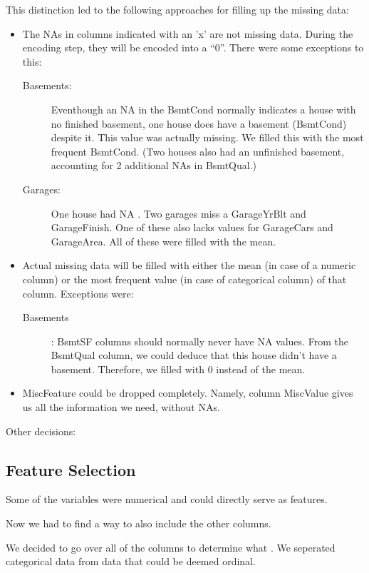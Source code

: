 \documentclass[a4paper, 12pt, twoside]{report}
\begin{document}
This distinction led to the following approaches for filling up the missing data:

\begin{itemize}
	\item The NAs in columns indicated with an 'x' are not missing data. During the encoding step, they will be encoded into a ``0''. There were some exceptions to this:
	\begin{description}
		\item[Basements:] Eventhough an NA in the BsmtCond normally indicates a house with no finished basement, one house does have a basement (BsmtCond) despite it. This value was actually missing.  We filled this with the most frequent BsmtCond. (Two houses also had an unfinished basement, accounting for 2 additional NAs in BsmtQual.)
		\item[Garages:] One house had NA . Two garages miss a GarageYrBlt and GarageFinish.  One of these also lacks values for GarageCars and GarageArea. All of these were filled with the mean.
\end{description}	
	
	\item Actual missing data will be filled with either the mean (in case of a numeric column) or the most frequent value (in case of categorical column) of that column. Exceptions were:
	\begin{description}
		\item[Basements]: BsmtSF columns should normally never have NA values. From the BsmtQual column, we could deduce that this house didn't have a basement. Therefore, we filled with 0 instead of the mean.
	\end{description}	

	\item MiscFeature could be dropped completely. Namely, column MiscValue gives us all the information we need, without NAs.
\end{itemize}

Other decisions:

 

\subsection{Feature Selection}
Some of the variables were numerical and could directly serve as features.

Now we had to find a way to also include the other columns.

We decided to go over all of the columns to determine what .
We seperated categorical data from data that could be deemed ordinal.
\end{document}
